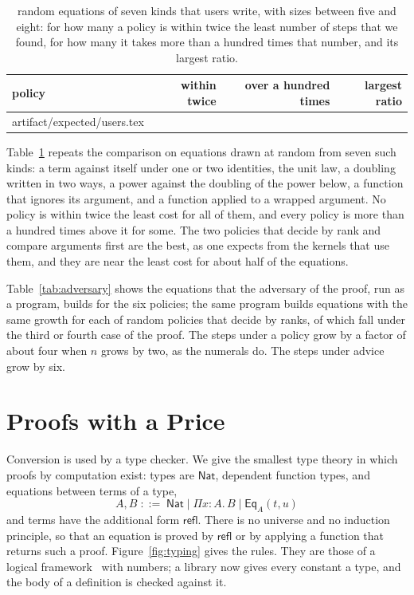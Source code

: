 \documentclass[acmsmall,nonacm,screen]{acmart}
\makeatletter
\newcommand{\kw}[1]{\mathsf{#1}}
\newcommand{\refl}{\kw{refl}}
\newcommand{\Nat}{\kw{Nat}}
\newcommand{\Eq}[3]{\kw{Eq}_{#1}(#2, #3)}
\newcommand{\claim}[2]{#2}
\newcommand{\rows}[1]{\@@input artifact/expected/#1.tex }
\makeatother
\begin{document}
\begin{table}
\caption{\exUserEquations{} random equations of seven kinds that users write, with sizes
between five and eight: for how many a policy is within twice the least number of steps that
we found, for how many it takes more than a hundred times that number, and its largest
ratio.}
\label{tab:users}
\begin{tabular}{lrrr}
\toprule
policy & within twice & over a hundred times & largest ratio \\
\midrule
\rows{users}
\bottomrule
\end{tabular}
\end{table}

Table~\ref{tab:users} repeats the comparison on \exUserEquations{} equations drawn at random
from seven such kinds: a term against itself under one or two identities, the unit law, a
doubling written in two ways, a power against the doubling of the power below, a function
that ignores its argument, and a function applied to a wrapped argument. \claim{users}{No
policy is within twice the least cost for all of them, and every policy is more than a
hundred times above it for some.} The two policies that decide by rank and compare arguments
first are the best, as one expects from the kernels that use them, and they are near the
least cost for about half of the equations.

\claim{adversary}{Table~\ref{tab:adversary} shows the equations that the adversary of the
proof, run as a program, builds for the six policies; the same program builds equations with
the same growth for each of \exRandomPolicies{} random policies that decide by ranks, of which
\exCaseThree{} fall under the third or fourth case of the proof.} The steps under a policy
grow by a factor of about four when $n$ grows by two, as the numerals do. The steps under
advice grow by six.

\section{Proofs with a Price}
\label{sec:proofs}

Conversion is used by a type checker. We give the smallest type theory in which proofs by
computation exist: types are $\Nat$, dependent function types, and equations between terms
of a type,
\[
  A, B \;::=\; \Nat \mid \Pi x{:}A.\, B \mid \Eq{A}{t}{u}
\]
and terms have the additional form $\refl$. There is no universe and no induction principle,
so that an equation is proved by $\refl$ or by applying a function that returns such a proof.
Figure~\ref{fig:typing} gives the rules. They are those of a logical framework~\cite{harper1993}
with numbers; a library now gives every constant a type, and the body of a definition is
checked against it.
\end{document}
